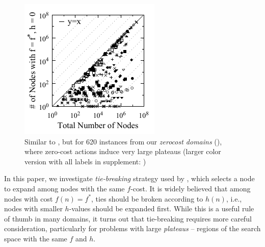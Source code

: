 \begin{figure}[htb]
\begin{minipage}[t]{\minilength}
{  }
  \label{plateau}
 \end{minipage} 
 \hfill
 \begin{minipage}[t]{0.26\textwidth}
  \centering
  \includegraphics{tables/aaai16-frontier/zerocost/lmcut_frontier-front-mono.pdf}
  \caption{Similar to , but for 620 instances from our 
  \emph{zerocost domains} (),
  where zero-cost actions induce very large plateaus
  (larger color version with all labels in supplement: )
 }
 \label{plateau-zerocost}
 \end{minipage}
\end{figure}

In this paper, we investigate \emph{tie-breaking} strategy used by
\astar, which selects a node to expand among nodes with the same
$f$-cost.  
It is widely believed that among nodes with
cost $f(n) = f^*$, ties should be broken according to $h(n)$, i.e.,
nodes with smaller $h$-values should be expanded first.  While this is a
useful rule of thumb in many domains, it turns out that tie-breaking
requires more careful consideration, particularly for problems with
large \emph{plateaus} -- regions of the search space with the same $f$ and $h$.

